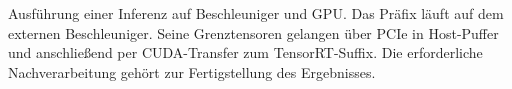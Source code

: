 Ausführung einer Inferenz auf Beschleuniger und GPU. Das Präfix läuft auf dem externen Beschleuniger. Seine Grenztensoren gelangen über PCIe in Host-Puffer und anschließend per CUDA-Transfer zum TensorRT-Suffix. Die erforderliche Nachverarbeitung gehört zur Fertigstellung des Ergebnisses.
